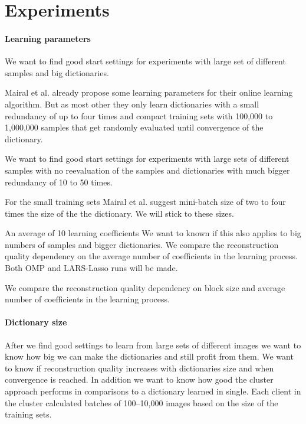 
\section{Experiments}

\paragraph{Learning parameters}
We want to find good start settings for experiments with large set of
different samples and big dictionaries.

Mairal et al. already propose some learning parameters for their online
learning algorithm. But as most other they only learn dictionaries with
a small redundancy of up to four times and compact training sets with 100,000
to 1,000,000 samples that get randomly evaluated until convergence of the
dictionary.

We want to find good start settings for experiments with large sets of
different samples with no reevaluation of the samples and dictionaries
with much bigger redundancy of 10 to 50 times.

For the small training sets Mairal et al. suggest mini-batch size of two to four
times the size of the the dictionary. We will stick to these sizes. 

An average of 10 learning coefficients 
We want to known if this also applies to big numbers of samples and bigger
dictionaries. We compare the reconstruction quality dependency on the average
number of coefficients in the learning process. Both OMP and LARS-Lasso runs
will be made.

We compare the reconstruction quality dependency on block size
and average number of coefficients in the learning process.


\paragraph{Dictionary size}
After we find good settings to learn from large sets of different images we
want to know how big we can make the dictionaries and still profit from them.
We want to know if reconstruction quality increases with dictionaries
size and when convergence is reached.
In addition we want to know how good the cluster approach performs in
comparisons to a dictionary learned in single. Each client in the cluster
calculated batches of 100--10,000 images based on the
size of the training sets.

